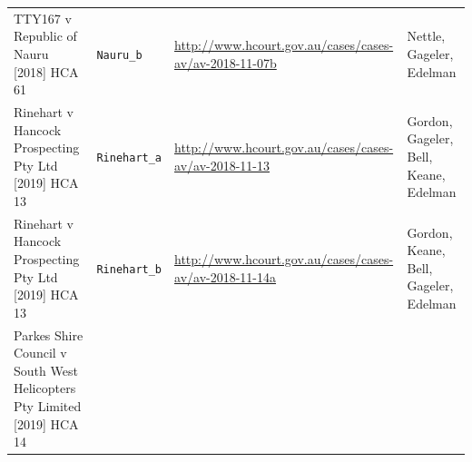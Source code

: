 \documentclass{monashthesis}
\begin{document}
\begin{longtable}[]{@{}llll@{}}
\begin{minipage}[t]{0.22\columnwidth}\raggedright
TTY167 v Republic of Nauru {[}2018{]} HCA 61\strut
\end{minipage} & \begin{minipage}[t]{0.15\columnwidth}\raggedright
\texttt{Nauru\_b}\strut
\end{minipage} & \begin{minipage}[t]{0.30\columnwidth}\raggedright
\url{http://www.hcourt.gov.au/cases/cases-av/av-2018-11-07b}\strut
\end{minipage} & \begin{minipage}[t]{0.22\columnwidth}\raggedright
Nettle, Gageler, Edelman\strut
\end{minipage}\tabularnewline
\begin{minipage}[t]{0.22\columnwidth}\raggedright
Rinehart v Hancock Prospecting Pty Ltd {[}2019{]} HCA 13\strut
\end{minipage} & \begin{minipage}[t]{0.15\columnwidth}\raggedright
\texttt{Rinehart\_a}\strut
\end{minipage} & \begin{minipage}[t]{0.30\columnwidth}\raggedright
\url{http://www.hcourt.gov.au/cases/cases-av/av-2018-11-13}\strut
\end{minipage} & \begin{minipage}[t]{0.22\columnwidth}\raggedright
Gordon, Gageler, Bell, Keane, Edelman\strut
\end{minipage}\tabularnewline
\begin{minipage}[t]{0.22\columnwidth}\raggedright
Rinehart v Hancock Prospecting Pty Ltd {[}2019{]} HCA 13\strut
\end{minipage} & \begin{minipage}[t]{0.15\columnwidth}\raggedright
\texttt{Rinehart\_b}\strut
\end{minipage} & \begin{minipage}[t]{0.30\columnwidth}\raggedright
\url{http://www.hcourt.gov.au/cases/cases-av/av-2018-11-14a}\strut
\end{minipage} & \begin{minipage}[t]{0.22\columnwidth}\raggedright
Gordon, Keane, Bell, Gageler, Edelman\strut
\end{minipage}\tabularnewline
\begin{minipage}[t]{0.22\columnwidth}\raggedright
Parkes Shire Council v South West Helicopters Pty Limited {[}2019{]} HCA 14\strut
\end{minipage} & \begin{minipage}[t]{0.15\columnwidth}\raggedright

\end{minipage}
\end{longtable}
\end{document}
